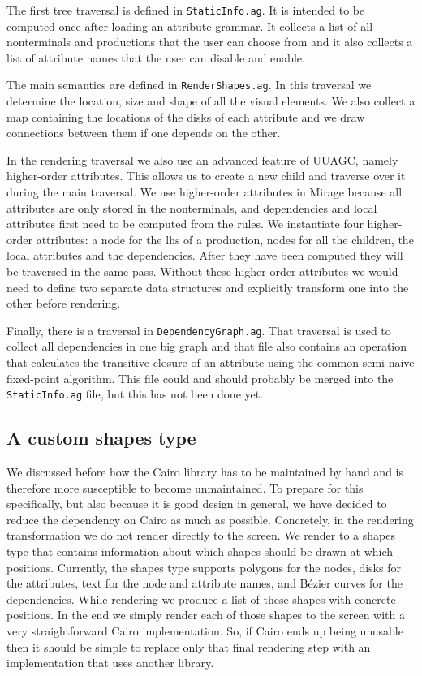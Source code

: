 \documentclass[11pt]{article}
\begin{document}
The first tree traversal is defined in \texttt{StaticInfo.ag}. It is intended to be computed once after loading an attribute grammar. It collects a list of all nonterminals and productions that the user can choose from and it also collects a list of attribute names that the user can disable and enable.

The main semantics are defined in \texttt{RenderShapes.ag}. In this traversal we determine the location, size and shape of all the visual elements. We also collect a map containing the locations of the disks of each attribute and we draw connections between them if one depends on the other.

In the rendering traversal we also use an advanced feature of UUAGC, namely higher-order attributes. This allows us to create a new child and traverse over it during the main traversal.
We use higher-order attributes in Mirage because all attributes are only stored in the nonterminals, and dependencies and local attributes first need to be computed from the rules.
We instantiate four higher-order attributes: a node for the lhs of a production, nodes for all the children, the local attributes and the dependencies.
After they have been computed they will be traversed in the same pass.
Without these higher-order attributes we would need to define two separate data structures and explicitly transform one into the other before rendering.


Finally, there is a traversal in  \texttt{DependencyGraph.ag}. That traversal is used to collect all dependencies in one big graph and that file also contains an operation that calculates the transitive closure of an attribute using the common semi-naive fixed-point algorithm. This file could and should probably be merged into the \texttt{StaticInfo.ag} file, but this has not been done yet.

\subsection{A custom shapes type}
\label{custom-shapes}

We discussed before how the Cairo library has to be maintained by hand and is therefore more susceptible to become unmaintained.
To prepare for this specifically, but also because it is good design in general, we have decided to reduce the dependency on Cairo as much as possible.
Concretely, in the rendering transformation we do not render directly to the screen.
We render to a shapes type that contains information about which shapes should be drawn at which positions.
Currently, the shapes type supports polygons for the nodes, disks for the attributes, text for the node and attribute names, and Bézier curves for the dependencies.
While rendering we produce a list of these shapes with concrete positions.
In the end we simply render each of those shapes to the screen with a very straightforward Cairo implementation.
So, if Cairo ends up being unusable then it should be simple to replace only that final rendering step with an implementation that uses another library.
\end{document}
